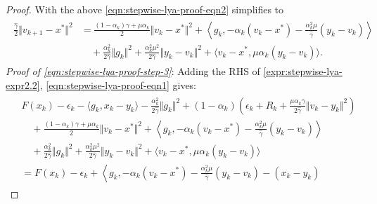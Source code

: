 \documentclass[12pt]{article}
\begin{document}
\begin{proof}
{        }
        With the above \eqref{eqn:stepwise-lya-proof-eqn2} simplifies to
        {\small
        \begin{align}\label{expr:stepwise-lya-expr2.2}
        \begin{split}
            \frac{\hat \gamma}{2}\Vert v_{k + 1} - x^*\Vert^2
            &=
            \frac{(1 - \alpha_k)\gamma + \mu \alpha_k}{2} \Vert v_k - x^*\Vert^2
            +
            \left\langle g_k,
                - \alpha_k(v_k - x^*)
                - \frac{\alpha_k^2\mu}{\hat \gamma}(y_k - v_k)
            \right\rangle
            \\
            & \quad
                + \frac{\alpha_k^2}{2\hat \gamma}\Vert g_k\Vert^2
                + \frac{\alpha_k^2 \mu^2}{2\hat \gamma}\Vert y_k - v_k\Vert^2
                + \langle v_k - x^*, \mu\alpha_k(y_k - v_k)\rangle.
        \end{split}
        \end{align}
        }
        \emph{Proof of \eqref{eqn:stepwise-lya-proof-step-3}}:
        Adding the RHS of \eqref{expr:stepwise-lya-expr2.2}, \eqref{eqn:stepwise-lya-proof-eqn1} gives:
        \begin{align}
        \begin{split}
            &
            F(x_k) - \epsilon_k - \langle  g_k, x_k - y_k\rangle
            - \frac{\alpha_k^2}{2\hat \gamma}\Vert g_k\Vert^2
            + (1 - \alpha_k)
            \left(
                \epsilon_k + R_k +
                \frac{\mu\alpha_k\gamma}{2\hat \gamma}
                \Vert v_k - y_k\Vert^2
            \right)
            \\
            &\quad
                +
                \frac{(1 - \alpha_k)\gamma + \mu \alpha_k}{2}
                \Vert v_k - x^*\Vert^2
                +
                \left\langle g_k,
                    - \alpha_k(v_k - x^*)
                    - \frac{\alpha_k^2\mu}{\hat \gamma}(y_k - v_k)
                \right\rangle
            \\
            & \quad
                + \frac{\alpha_k^2}{2\hat \gamma}\Vert g_k\Vert^2
                + \frac{\alpha_k^2 \mu^2}{2\hat \gamma}\Vert y_k - v_k\Vert^2
                + \langle v_k - x^*, \mu\alpha_k(y_k - v_k)\rangle
            \\
            &=
            F(x_k) - \epsilon_k
            + \left\langle
                g_k,
                - \alpha_k(v_k - x^*)
                - \frac{\alpha_k^2\mu}{\hat \gamma}(y_k - v_k)
                - (x_k - y_k)

\end{split}
\end{align}
\end{proof}
\end{document}
